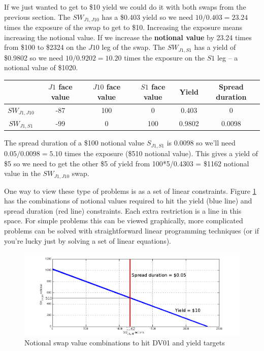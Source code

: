 If we just wanted to get to \$10 yield we could do it with both swaps from the previous section.  The $SW_{J1,J10}$ has a \$0.403 yield so we need $10/0.403 = 23.24$ times the exposure of the swap to get to \$10.  Increasing the exposure means increasing the notional value. If we increase the \textbf{notional value} by 23.24 times  from \$100 to \$2324 on the $J10$ leg of the swap. The $SW_{J1,S1}$ has  a yield of \$0.9802 so we need $10/0.9202 = 10.20$ times the exposure on the $S1$ leg -- a notional value of \$1020. 

\begin{tabular}{|c|ccccc|}
\hline
 & $J1$ face value & $J10$ face value & $S1$ face value & Yield & Spread duration\\
\hline
$SW_{J1,J10}$ & -87 & 100 & 0 & 0.403 & 0\\
$SW_{J1,S1}$ & -99 &  0 & 100 &  0.9802 & 0.0098\\
\hline
\end{tabular}

The spread duration of a \$100 notional value $S_{J1,S1}$ is 0.0098 so we'll need $0.05/0.0098 = 5.10$ times the exposure (\$510 notional value). This gives a yield of \$5 so we need to get the other \$5 of yield from 100*5/0.4303 = \$1162 notional value in the $SW_{J1,J10}$ swap.

One way to view these type of problems is as a set of linear constraints. Figure \ref{fig:yieldDV01} has the combinations of notional values required to hit the yield (blue line) and spread duration (red line) constraints. Each extra restriction is a line in this space. For simple problems this can be viewed graphically, more complicated problems can be solved with straightforward linear programming techniques (or if you're lucky just by solving a set  of linear equations). 

\begin{figure}[ht]
\centering
  \includegraphics[width=5in] {pics/yieldDV01}
\caption{Notional swap value combinations to hit DV01 and yield targets}
\label{fig:yieldDV01}
\end{figure}

